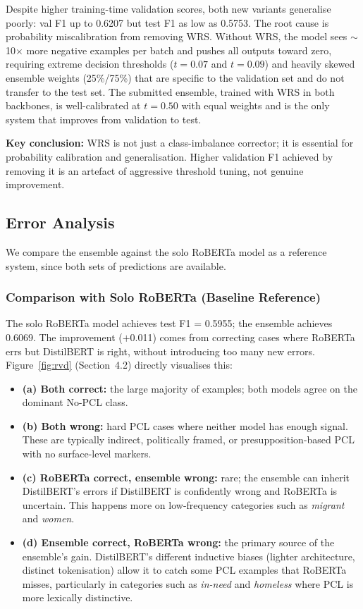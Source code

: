 \documentclass[11pt]{article}
\begin{document}
Despite higher training-time validation scores, both new variants generalise poorly: val F1 up to 0.6207 but test F1 as low as 0.5753. The root cause is probability miscalibration from removing WRS. Without WRS, the model sees $\sim$10$\times$ more negative examples per batch and pushes all outputs toward zero, requiring extreme decision thresholds ($t=0.07$ and $t=0.09$) and heavily skewed ensemble weights (25\%/75\%) that are specific to the validation set and do not transfer to the test set. The submitted ensemble, trained with WRS in both backbones, is well-calibrated at $t=0.50$ with equal weights and is the only system that improves from validation to test.

\textbf{Key conclusion:} WRS is not just a class-imbalance corrector; it is essential for probability calibration and generalisation. Higher validation F1 achieved by removing it is an artefact of aggressive threshold tuning, not genuine improvement.

\clearpage
\subsection{Error Analysis}

We compare the ensemble against the solo RoBERTa model as a reference system, since both sets of predictions are available.

\subsubsection*{Comparison with Solo RoBERTa (Baseline Reference)}

The solo RoBERTa model achieves test F1 = 0.5955; the ensemble achieves 0.6069. The improvement ($+$0.011) comes from correcting cases where RoBERTa errs but DistilBERT is right, without introducing too many new errors. Figure~\ref{fig:rvd} (Section~4.2) directly visualises this:

\begin{itemize}[noitemsep]
    \item \textbf{(a) Both correct:} the large majority of examples; both models agree on the dominant No-PCL class.
    \item \textbf{(b) Both wrong:} hard PCL cases where neither model has enough signal. These are typically indirect, politically framed, or presupposition-based PCL with no surface-level markers.
    \item \textbf{(c) RoBERTa correct, ensemble wrong:} rare; the ensemble can inherit DistilBERT's errors if DistilBERT is confidently wrong and RoBERTa is uncertain. This happens more on low-frequency categories such as \textit{migrant} and \textit{women}.
    \item \textbf{(d) Ensemble correct, RoBERTa wrong:} the primary source of the ensemble's gain. DistilBERT's different inductive biases (lighter architecture, distinct tokenisation) allow it to catch some PCL examples that RoBERTa misses, particularly in categories such as \textit{in-need} and \textit{homeless} where PCL is more lexically distinctive.
\end{itemize}
\end{document}
